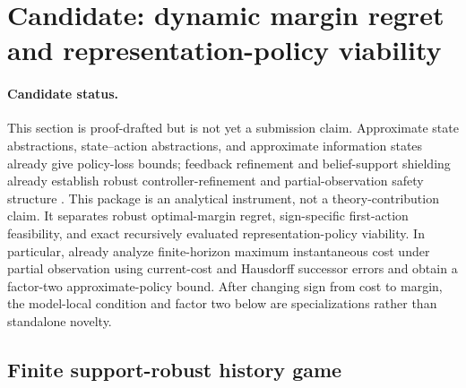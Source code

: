 \section{Candidate: dynamic margin regret and representation-policy viability}
\label{sec:theory-v2-candidate}

\paragraph{Candidate status.}
This section is proof-drafted but is not yet a submission claim.  Approximate state abstractions,
state--action abstractions, and approximate information states already give policy-loss bounds;
feedback refinement and belief-support shielding already establish robust controller-refinement
and partial-observation safety structure
\citep{abel2016approximate,abel2020value,subramanian2022ais,dave2024ais,
dave2023worstcase,reissig2017feedback,sheng2024safe,girard2012safety}.
This package is an analytical instrument, not a theory-contribution claim.  It separates robust
optimal-margin regret, sign-specific first-action feasibility, and exact recursively evaluated
representation-policy viability.
In particular, \citet{dave2024ais} already analyze finite-horizon maximum instantaneous cost under
partial observation using current-cost and Hausdorff successor errors and obtain a factor-two
approximate-policy bound.  After changing sign from cost to margin, the model-local condition and
factor two below are specializations rather than standalone novelty.

\subsection{Finite support-robust history game}

